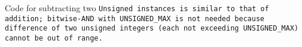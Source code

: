 Code for subtracting two \tt{Unsigned} instances is similar to that of addition;
bitwise-AND with \tt{UNSIGNED_MAX} is not needed because difference of two
unsigned integers (each not exceeding \tt{UNSIGNED_MAX}) cannot be out of range.

